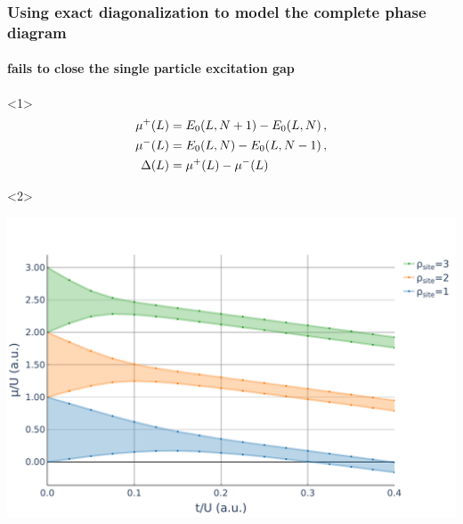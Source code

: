 \documentclass[aspectratio=169]{beamer}
\begin{document}
\begin{frame}
  \frametitle{Using exact diagonalization to model the complete phase diagram}
  \framesubtitle<2>{fails to close the single particle excitation gap}
  \begin{onlyenv}<1>
    \begin{align}
      \mu^+(L) &= E_0(L, N+1) - E_0(L, N) \thinspace ,\\
      \mu^-(L) &= E_0(L, N) - E_0(L, N-1) \thinspace , \\
      \Delta(L) &= \mu^+(L) - \mu^-(L)
    \end{align}
  \end{onlyenv}
  \begin{onlyenv}<2>
    \begin{center}
      \includegraphics[scale=0.3]{../img/Mott-Lobes-ED.pdf}
    \end{center}
  \end{onlyenv}
\end{frame}
\end{document}
